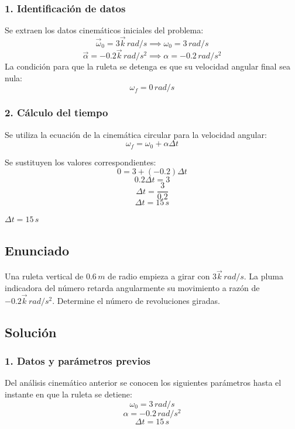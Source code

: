 \documentclass[12pt, a4paper]{article}
\begin{document}
\subsubsection*{1. Identificación de datos}
Se extraen los datos cinemáticos iniciales del problema:
$$ \vec{\omega}_0 = 3\vec{k} \, \si{rad/s} \implies \omega_0 = 3 \, \si{rad/s} $$
$$ \vec{\alpha} = -0.2\vec{k} \, \si{rad/s^2} \implies \alpha = -0.2 \, \si{rad/s^2} $$
La condición para que la ruleta se detenga es que su velocidad angular final sea nula:
$$ \omega_f = 0 \, \si{rad/s} $$

\subsubsection*{2. Cálculo del tiempo}
Se utiliza la ecuación de la cinemática circular para la velocidad angular:
$$ \omega_f = \omega_0 + \alpha \Delta t $$

Se sustituyen los valores correspondientes:
$$ 0 = 3 + (-0.2) \Delta t $$
$$ 0.2 \Delta t = 3 $$
$$ \Delta t = \frac{3}{0.2} $$
$$ \Delta t = 15 \, \si{s} $$

\begin{tcolorbox}[colback=green!5!white, colframe=green!50!black, title=Respuesta Final]
\centering \Large $\Delta t = 15 \, \si{s}$
\end{tcolorbox}

\newpage

\subsection*{Enunciado}
Una ruleta vertical de $0.6 \, \si{m}$ de radio empieza a girar con $3\vec{k} \, \si{rad/s}$. La pluma indicadora del número retarda angularmente su movimiento a razón de $-0.2\vec{k} \, \si{rad/s^2}$. Determine el número de revoluciones giradas.

\subsection*{Solución}

\subsubsection*{1. Datos y parámetros previos}
Del análisis cinemático anterior se conocen los siguientes parámetros hasta el instante en que la ruleta se detiene:
$$ \omega_0 = 3 \, \si{rad/s} $$
$$ \alpha = -0.2 \, \si{rad/s^2} $$
$$ \Delta t = 15 \, \si{s} $$
\end{document}
